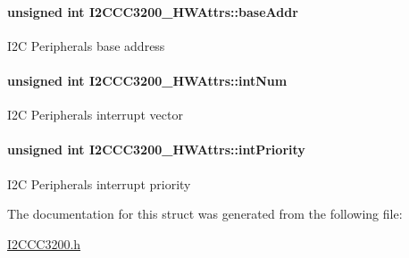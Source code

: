 \paragraph[{base\+Addr}]{\setlength{\rightskip}{0pt plus 5cm}unsigned int I2\+C\+C\+C3200\+\_\+\+H\+W\+Attrs\+::base\+Addr}\label{struct_i2_c_c_c3200___h_w_attrs_aad58884ee0e40e6b4eda27d212c0339b}
I2\+C Peripheral\textquotesingle{}s base address 
\paragraph[{int\+Num}]{\setlength{\rightskip}{0pt plus 5cm}unsigned int I2\+C\+C\+C3200\+\_\+\+H\+W\+Attrs\+::int\+Num}\label{struct_i2_c_c_c3200___h_w_attrs_a944246733bda012f41d4eb1b9b4b3b8b}
I2\+C Peripheral\textquotesingle{}s interrupt vector 
\paragraph[{int\+Priority}]{\setlength{\rightskip}{0pt plus 5cm}unsigned int I2\+C\+C\+C3200\+\_\+\+H\+W\+Attrs\+::int\+Priority}\label{struct_i2_c_c_c3200___h_w_attrs_af3153448f4918bfde5041a411c984daf}
I2\+C Peripheral\textquotesingle{}s interrupt priority 

The documentation for this struct was generated from the following file\+:\begin{DoxyCompactItemize}
\item 
\hyperlink{_i2_c_c_c3200_8h}{I2\+C\+C\+C3200.\+h}\end{DoxyCompactItemize}
